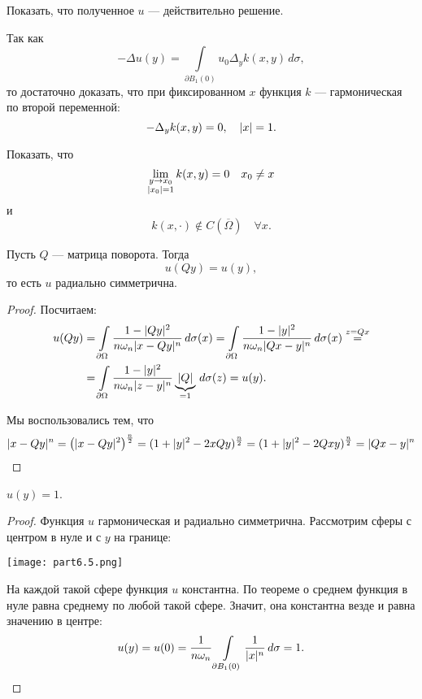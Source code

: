 \begin{exercise} Показать, что полученное $u$ --- действительно решение.
\end{exercise}
\begin{note}Так как
$$- \Delta u(y) = \int \limits_{\partial B_1 (0)} u_0 \Delta_y k(x, y) \, d\sigma,$$
то достаточно доказать, что при фиксированном $x$ функция $k$ --- гармоническая по второй переменной:
$$ - \Delta_y k(x,y) = 0, \quad \lvert x\rvert = 1.$$
\end{note}

\begin{exercise} Показать, что
$$ \lim_{\substack{y \to x_0 \\ \lvert x_0\rvert = 1}} k(x, y) = 0 \quad x_0 \neq x$$
и
$$ k( x, \cdot) \notin C(\overline{\Omega}) \quad \forall x.$$
\end{exercise}

\begin{note}Пусть $Q$ --- матрица поворота. Тогда
$$ u(Qy) = u(y),$$
то есть $u$ радиально симметрична.
\end{note}
\begin{proof}
Посчитаем:
\begin{align*}
	u(Qy) &= \int \limits_{\partial \Omega} \frac {1 - \lvert Qy\rvert^2} {n \omega_n \lvert x-Qy\rvert^n} \, d\sigma(x) = \int \limits_{\partial \Omega} \frac {1 - \lvert y\rvert^2} {n \omega_n \lvert Qx-y\rvert^n} \, d\sigma(x) \stackrel{z = Qx} = \\
	&= \int \limits_{\partial \Omega} \frac {1 - \lvert y\rvert^2} {n \omega_n \lvert z - y\rvert^n} \underbrace {\lvert Q\rvert}_{=1} \, d\sigma(z) = u(y). 
\end{align*}

Мы воспользовались тем, что
\begin{align*}
	\lvert x-Qy\rvert^n = \left( \lvert x-Qy\rvert^2 \right)^{\frac {n} {2}} = (1 + \lvert y\rvert^2 - 2 x Q y)^{\frac {n} {2}} = (1 + \lvert y\rvert^2 - 2Qxy)^{\frac {n} {2}} = \lvert Qx - y\rvert^n
\end{align*}

\end{proof}

\begin{note} $u(y) = 1$.
\end{note}
\begin{proof}
Функция $u$ гармоническая и радиально симметрична. Рассмотрим сферы с центром в нуле и с $y$ на границе:
\begin{center}
\texttt{[image: part6.5.png]}
\end{center}
На каждой такой сфере функция $u$ константна. По теореме о среднем функция в нуле равна среднему по любой такой сфере. Значит, она константна везде и равна значению в центре:
$$ u(y) = u(0) = \frac {1} {n \omega_n} \int \limits_{\partial B_1 (0)} \frac {1} {\lvert x\rvert^n} \, d\sigma = 1.$$

\end{proof}

